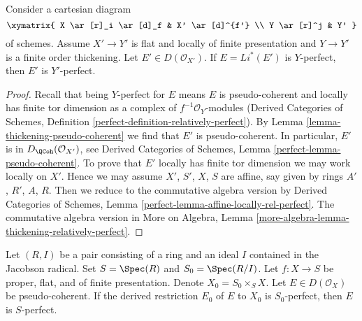 \begin{lemma}
\label{lemma-thickening-relatively-perfect}
Consider a cartesian diagram
$$
\xymatrix{
X \ar[r]_i \ar[d]_f & X' \ar[d]^{f'} \\
Y \ar[r]^j & Y'
}
$$
of schemes. Assume $X' \to Y'$ is flat and locally
of finite presentation and $Y \to Y'$ is a finite order thickening.
Let $E' \in D(\mathcal{O}_{X'})$. If $E = Li^*(E')$ is $Y$-perfect,
then $E'$ is $Y'$-perfect.
\end{lemma}

\begin{proof}
Recall that being $Y$-perfect for $E$ means $E$ is
pseudo-coherent and locally has finite tor dimension as a complex
of $f^{-1}\mathcal{O}_Y$-modules
(Derived Categories of Schemes,
Definition \ref{perfect-definition-relatively-perfect}).
By Lemma \ref{lemma-thickening-pseudo-coherent}
we find that $E'$ is pseudo-coherent.
In particular, $E'$ is in $D_\QCoh(\mathcal{O}_{X'})$, see
Derived Categories of Schemes, Lemma \ref{perfect-lemma-pseudo-coherent}.
To prove that $E'$ locally has finite tor dimension
we may work locally on $X'$. Hence we may assume
$X'$, $S'$, $X$, $S$ are affine, say given by
rings $A'$, $R'$, $A$, $R$.
Then we reduce to the commutative algebra version by
Derived Categories of Schemes,
Lemma \ref{perfect-lemma-affine-locally-rel-perfect}.
The commutative algebra version in More on Algebra, Lemma
\ref{more-algebra-lemma-thickening-relatively-perfect}.
\end{proof}

\begin{lemma}
\label{lemma-henselian-relatively-perfect}
Let $(R, I)$ be a pair consisting of a ring and an ideal $I$
contained in the Jacobson radical. Set $S = \Spec(R)$ and $S_0 = \Spec(R/I)$.
Let $f : X \to S$ be proper, flat, and of finite presentation.
Denote $X_0 = S_0 \times_S X$. Let $E \in D(\mathcal{O}_X)$
be pseudo-coherent. If the derived restriction $E_0$ of $E$
to $X_0$ is $S_0$-perfect, then $E$ is $S$-perfect.
\end{lemma}

